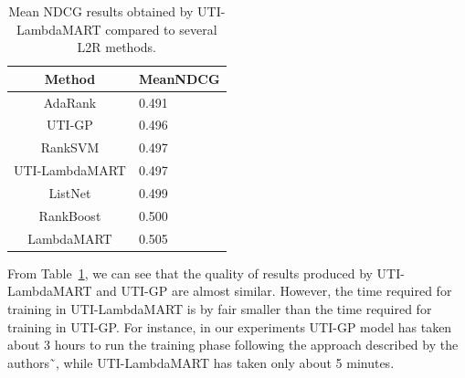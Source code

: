 \documentclass[preprint,review,10pt,3p]{elsarticle}
\begin{document}
\begin{table}

\caption{Mean NDCG results obtained by UTI-LambdaMART compared to
several L2R methods.}

\label{tab:baseline}

\begin{center}

\begin{tabular}{|c|l|}

\hline

\textbf{Method} & \textbf{MeanNDCG} \\

\hline\hline

AdaRank & 0.491 \\

\hline

UTI-GP & 0.496\\

\hline

RankSVM & 0.497 \\

\hline

UTI-LambdaMART & 0.497 \\

\hline

ListNet & 0.499 \\

\hline

RankBoost & 0.500 \\

\hline

LambdaMART & 0.505 \\

\hline

\end{tabular}

\end{center}

\end{table}



From Table~\ref{tab:baseline}, we can see that the quality of results
produced by UTI-LambdaMART and UTI-GP are almost similar. However, the
time required for training in UTI-LambdaMART is by fair smaller than
the time required for training in UTI-GP. For instance, in our
experiments UTI-GP model has taken about 3 hours to run the training
phase following the approach described by the
authors˜\cite{costa2012lepref}, while UTI-LambdaMART has taken only
about 5 minutes.
\end{document}
